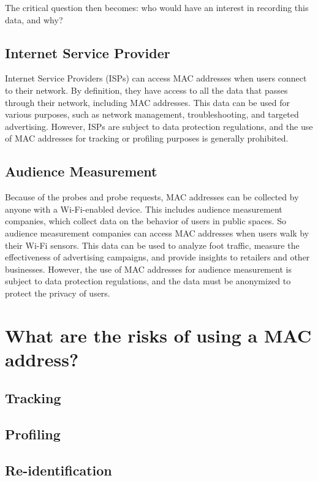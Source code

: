 \documentclass[aps,prb,twocolumn,superscriptaddress,floatfix,longbibliography,nofootinbib]{revtex4-2}
\begin{document}
  The critical question then becomes: who would have an interest in recording this data, and why? 

  \subsection{\label{subsec:ISP}Internet Service Provider}
  Internet Service Providers (ISPs) can access MAC addresses when users connect to their network.
  By definition, they have access to all the data that passes through their network, including MAC addresses.
  This data can be used for various purposes, such as network management, troubleshooting, 
  and targeted advertising. However, ISPs are subject to data protection regulations,
  and the use of MAC addresses for tracking or profiling purposes is generally prohibited.

  \subsection{\label{subsec:Audience}Audience Measurement}
  Because of the probes and probe requests, MAC addresses can be collected by anyone with a Wi-Fi-enabled device.
  This includes audience measurement companies, which collect data on the behavior of users in public spaces.
  So audience measurement companies can access MAC addresses when users walk by their Wi-Fi sensors.
  This data can be used to analyze foot traffic, measure the effectiveness of advertising campaigns,
  and provide insights to retailers and other businesses. However, the use of MAC addresses for audience measurement
  is subject to data protection regulations, and the data must be anonymized to protect the privacy of users.


\section{\label{sec:Risks}What are the risks of using a MAC address?}
  \subsection{\label{subsec:Tracking}Tracking}
  \subsection{\label{subsec:Profiling}Profiling}
  \subsection{\label{subsec:Reidentification}Re-identification}
\end{document}
